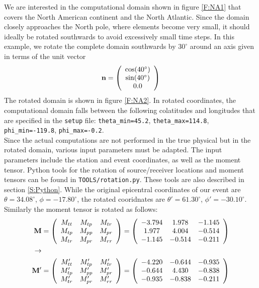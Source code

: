 We are interested in the computational domain shown in figure \ref{F:NA1} that covers the North American continent and the North Atlantic. Since the domain closely approaches the North pole, where elements become very small, it should ideally be rotated southwards to avoid excessively small time steps. In this example, we rotate the complete domain southwards by $30^\circ$ around an axis given in terms of the unit vector
\begin{equation}
\mathbf{n} = \left( \begin{array}{c} \text{cos}(40^\circ) \\ \text{sin}(40^\circ) \\ 0.0 \end{array} \right)
\end{equation}
The rotated domain is shown in figure \ref{F:NA2}. In rotated coordinates, the computational domain falls between the following colatitudes and longitudes that are specified in the \texttt{setup} file: \texttt{theta\_min=45.2}, \texttt{theta\_max=114.8}, \texttt{phi\_min=-119.8}, \texttt{phi\_max=-0.2}.\\[5pt]
Since the actual computations are not performed in the true physical but in the rotated domain, various input parameters must be adapted. The input parameters include the station and event coordinates, as well as the moment tensor. Python tools for the rotation of source/receiver locations and moment tensors can be found in \texttt{TOOLS/rotation.py}. These tools are also described in section \ref{S:Python}. While the original epicentral coordinates of our event are $\theta=34.08^\circ$, $\phi=-17.80^\circ$, the rotated cooridnates are $\theta'=61.30^\circ$, $\phi'=-30.10^\circ$. Similarly the moment tensor is rotated as follows:
\begin{align}
\mathbf{M}&=\left(\begin{array}{ccc}
M_{tt} & M_{tp} & M_{tr} \\ M_{tp} & M_{pp} & M_{pr} \\ M_{tr} & M_{pr} & M_{rr}
\end{array}\right)
=
\left(\begin{array}{ccc}
-3.794 & 1.978 & -1.145 \\ 1.977 & 4.004 & -0.514 \\ -1.145 & -0.514 & -0.211
\end{array}\right) \notag\\
\to \notag \\
\mathbf{M'}&=\left(\begin{array}{ccc}
M'_{tt} & M'_{tp} & M'_{tr} \\ M'_{tp} & M'_{pp} & M'_{pr} \\ M'_{tr} & M'_{pr} & M'_{rr}
\end{array}\right)
=
\left(\begin{array}{ccc}
-4.220 & -0.644 & -0.935 \\ -0.644 & 4.430 & -0.838 \\ -0.935 & -0.838 & -0.211
\end{array}\right) 
\end{align}
